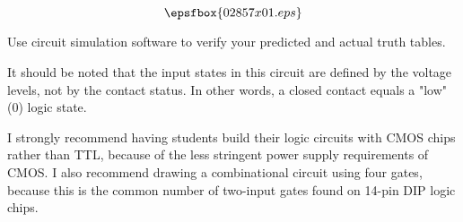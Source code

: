 

$$\epsfbox{02857x01.eps}$$

\vfil \eject






Use circuit simulation software to verify your predicted and actual truth tables.







It should be noted that the input states in this circuit are defined by the voltage levels, not by the contact status.  In other words, a closed contact equals a "low" (0) logic state.

I strongly recommend having students build their logic circuits with CMOS chips rather than TTL, because of the less stringent power supply requirements of CMOS.  I also recommend drawing a combinational circuit using four gates, because this is the common number of two-input gates found on 14-pin DIP logic chips.




